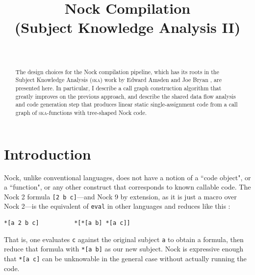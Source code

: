 \documentclass[twoside]{article}
\title{Nock Compilation\\(Subject Knowledge Analysis II)}
\author{\authorname~\authorpatp \\ \affiliation}
\date{}
\begin{document}
\maketitle
\thispagestyle{firststyle}

\begin{abstract}
\sloppy
The design choices for the Nock compilation pipeline, which has its roots in the Subject Knowledge Analysis (\textsc{ska}) work by Edward Amsden  and Joe Bryan , are presented here. In particular, I describe a call graph construction algorithm that greatly improves on the previous approach, and describe the shared data flow analysis and code generation step that produces linear static single-assignment code from a call graph of \textsc{ska}-functions with tree-shaped Nock code.
\end{abstract}

\setcounter{page}{43}

\tableofcontents

\section{Introduction}

\sloppy
Nock, unlike conventional languages, does not have a notion of a ``code object", or a ``function", or any other construct that corresponds to known callable code.  The Nock 2 formula \texttt{[2 b c]}---and Nock 9 by extension, as it is just a macro over Nock 2---is the equivalent of \texttt{eval} in other languages and reduces like this \citep{nock4-spec}:

\begin{lstlisting}[style=listingblock]
*[a 2 b c]          *[*[a b] *[a c]]
\end{lstlisting}

\noindent
That is, one evaluates \texttt{c} against the original subject \texttt{a} to obtain a formula, then reduce that formula with \texttt{*[a b]} as our new subject. Nock is expressive enough that \texttt{*[a c]} can be unknowable in the general case without actually running the code.
\end{document}
